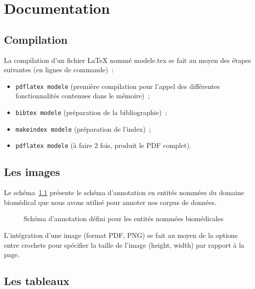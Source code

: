 \chapter{Documentation}

\section{Compilation}
\label{sec:compilation}
La compilation d'un fichier \LaTeX{} nommé \og{}modele.tex\fg{} se fait au moyen des étapes suivantes (en lignes de commande)~:
%
\begin{itemize}
\item \verb+pdflatex modele+ (première compilation pour l'appel des différentes fonctionnalités contenues dans le mémoire)~;
\item \verb+bibtex modele+ (préparation de la bibliographie)~;
\item \verb+makeindex modele+ (préparation de l'index)~;
\item \verb+pdflatex modele+ (à faire 2 fois, produit le PDF complet).
\end{itemize}




\section{Les images}
\label{sec:images}

Le  schéma~\ref{fig:schema} présente le schéma
d'annotation en entités nommées du domaine biomédical que nous avons
utilisé pour annoter nos corpus de données.
%
\begin{figure}[h]
  \centering
  \caption{Schéma d'annotation défini pour les entités nommées
    biomédicales}
  \label{fig:schema}
\end{figure}

L'intégration d'une image (format PDF, PNG) se fait au moyen de la
options entre crochets pour spécifier la taille de l'image (height,
width) par rapport à la page.



\newpage
\section{Les tableaux}
\label{sec:tableaux}


